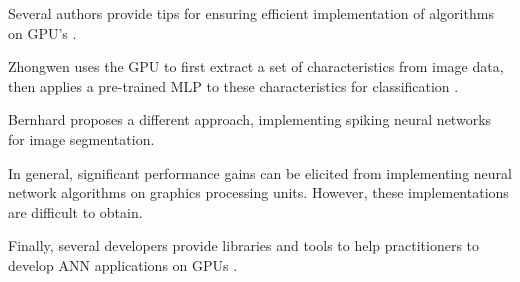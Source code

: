 \documentclass[prodmode,acmtecs]{acmsmall}
\begin{document}
Several authors provide tips for ensuring efficient implementation  of algorithms on GPU’s \cite{Oh2004,Luo2005,Martinez2007,Martinez2010}.

Zhongwen uses the GPU to first extract a set of characteristics from image data, then applies a pre-trained MLP to these characteristics for classification \cite{Luo2005}.

Bernhard \cite{BernhardCITA17} proposes a different approach, implementing spiking neural networks for image segmentation.

In general, significant performance gains can be elicited from implementing neural network algorithms on graphics processing units. However, these implementations are difficult to obtain.

Finally, several developers provide libraries and tools to help practitioners to develop ANN applications on GPUs \cite{url2}.



\end{document}
